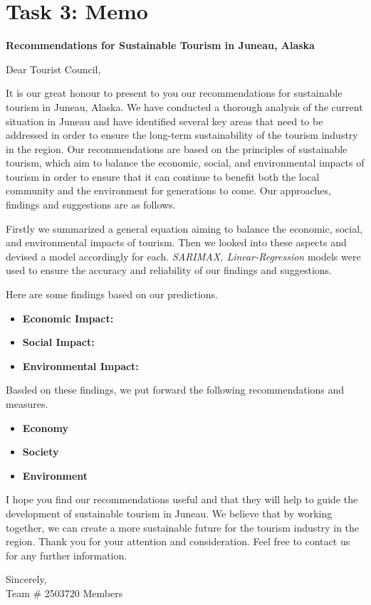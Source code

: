 \section{Task 3: Memo}
\begin{center}
    \Large\textbf{Recommendations for Sustainable Tourism in Juneau, Alaska}
\end{center}

{\small

Dear Tourist Council,

It is our great honour to present to you our recommendations for 
sustainable tourism in Juneau, Alaska. We have conducted a thorough 
analysis of the current situation in Juneau and have identified several key 
areas that need to be addressed in order to ensure the long-term sustainability 
of the tourism industry in the region. 
Our recommendations are based on the principles of sustainable tourism, 
which aim to balance the economic, social, and environmental impacts of tourism 
in order to ensure that it can continue to benefit both the local community and 
the environment for generations to come. Our approaches, findings and suggestions are as follows.

Firstly we summarized a general equation aiming to balance the economic, social, 
and environmental impacts of tourism. Then we looked into these aspects
and devised a model accordingly for each. \textit{SARIMAX, Linear-Regression} models 
were used to ensure the accuracy and reliability of our findings and suggestions.

Here are some findings based on our predictions.

\begin{itemize}
    \item \textbf{Economic Impact:}
    \item \textbf{Social Impact:}
    \item \textbf{Environmental Impact:}
\end{itemize}

Basded on these findings, we put forward the following recommendations and measures.

\begin{itemize}
    \item \textbf{Economy}
    \item \textbf{Society}
    \item \textbf{Environment}
\end{itemize}

I hope you find our recommendations useful and that they will help to guide
the development of sustainable tourism in Juneau. We believe that by working
together, we can create a more sustainable future for the tourism industry in
the region. Thank you for your attention and consideration. Feel free to contact us for any further information.

\begin{flushright}
    Sincerely,\\
    Team \# 2503720 Members
    \end{flushright}

}

\clearpage